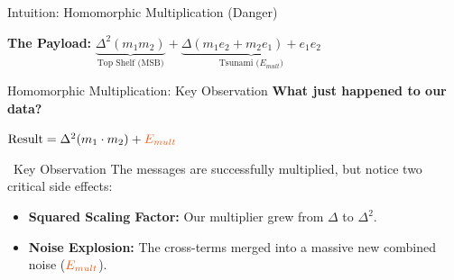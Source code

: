 \documentclass[aspectratio=169, 10pt]{beamer}
\begin{document}
\begin{frame}{Intuition: Homomorphic Multiplication (Danger)}
\begin{center}
{
    }
    \end{center}
    \vspace{0.1cm}
    \centering
    \large \textbf{The Payload:} \quad $\underbrace{\Delta^2(m_1 m_2)}_{\text{Top Shelf (MSB)}} + \underbrace{\Delta(m_1 e_2 + m_2 e_1) + e_1 e_2}_{\text{Tsunami ($E_{mult}$)}}$
\end{frame}

\begin{frame}{Homomorphic Multiplication: Key Observation}
    \Large
    \textbf{What just happened to our data?} \\[0.3cm]
    
    {\centering
    $\text{Result} = \Delta^2(m_1 \cdot m_2) + \textcolor{AccentOrange}{{E_{mult}}}$ \par}
    \vspace{0.4cm}
    
    \begin{block}{\faSearch \ Key Observation}
        \small
        The messages are successfully multiplied, but notice two critical side effects:
        \begin{itemize}
            \item \textbf{Squared Scaling Factor:} Our multiplier grew from $\Delta$ to $\Delta^2$.
            \item \textbf{Noise Explosion:} The cross-terms merged into a massive new combined noise ($\textcolor{AccentOrange}{{E_{mult}}}$).
        \end{itemize}
    \end{block}
\end{frame}
\end{document}
